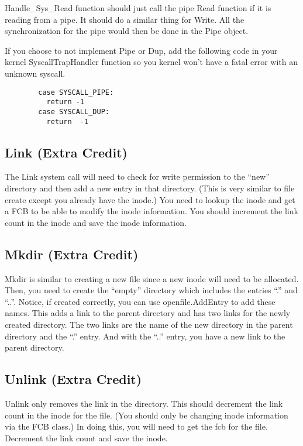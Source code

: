 \documentclass[11pt]{article}
\begin{document}
Handle\_Sys\_Read function should just call the pipe Read function
if it is reading from a pipe.  It should do a similar thing for
Write.   All the synchronization for the pipe would then be done in
the Pipe object.

If you choose to not implement Pipe or Dup, add the following code in
your kernel SyscallTrapHandler function so you kernel won't have a
fatal error with an unknown syscall.

\begin{verbatim}
        case SYSCALL_PIPE:
          return -1
        case SYSCALL_DUP:
          return  -1
\end{verbatim}

\subsection{Link (Extra Credit)}

The Link system call will need to check for write permission to the
``new'' directory and then add a new entry in that directory. (This is
very similar to file create except you already have the inode.)  You
need to lookup the inode and get a FCB to be able to modify the inode
information.  You should increment the link count in the inode and
save the inode information.

\subsection{Mkdir (Extra Credit)}

Mkdir is similar to creating a new file since a new inode will need to
be allocated.  Then, you need to create the ``empty'' directory which
includes the entries ``.'' and ``..''. Notice, if created correctly,
you can use openfile.AddEntry to add these names.  This adds a link to
the parent directory and has two links for the newly created
directory.  The two links are the name of the new directory in the
parent directory and the ``.'' entry.  And with the ``..'' entry, you
have a new link to the parent directory.

\subsection{Unlink (Extra Credit)}

Unlink only removes the link in the directory.  This should decrement
the link count in the inode for the file.  (You should only be
changing inode information via the FCB class.)  In doing this, you
will need to get the fcb for the file.  Decrement the link count and
save the inode.
\end{document}

